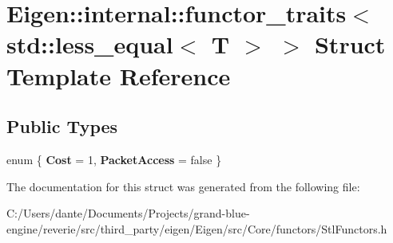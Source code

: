 \hypertarget{struct_eigen_1_1internal_1_1functor__traits_3_01std_1_1less__equal_3_01_t_01_4_01_4}{}\section{Eigen\+::internal\+::functor\+\_\+traits$<$ std\+::less\+\_\+equal$<$ T $>$ $>$ Struct Template Reference}
\label{struct_eigen_1_1internal_1_1functor__traits_3_01std_1_1less__equal_3_01_t_01_4_01_4}
\subsection*{Public Types}
\begin{DoxyCompactItemize}
\item 
\mbox{\label{struct_eigen_1_1internal_1_1functor__traits_3_01std_1_1less__equal_3_01_t_01_4_01_4_a202c8020dac2f388b912c8436218a05c}} 
enum \{ {\bfseries Cost} = 1, 
{\bfseries Packet\+Access} = false
 \}
\end{DoxyCompactItemize}


The documentation for this struct was generated from the following file\+:\begin{DoxyCompactItemize}
\item 
C\+:/\+Users/dante/\+Documents/\+Projects/grand-\/blue-\/engine/reverie/src/third\+\_\+party/eigen/\+Eigen/src/\+Core/functors/Stl\+Functors.\+h\end{DoxyCompactItemize}
